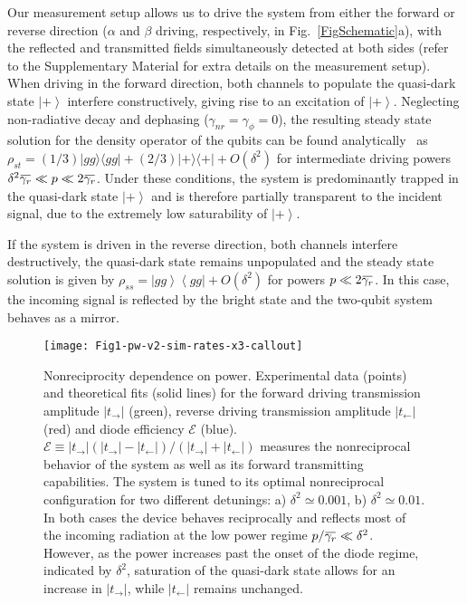 \documentclass[pra, twocolumn, amsmath, amssymb, notitlepage, longbibliography, showpacs, superscriptaddress]{revtex4-1}
\newcommand{\bra}[1]{\ensuremath{\left\langle #1\r|}}
\newcommand{\ket}[1]{\ensuremath{\left|#1\r\rangle}}
\renewcommand{\r}[0]{\right}
\newcommand{\overbar}[1]{\mkern 1.5mu\overline{\mkern-1.5mu#1\mkern-1.5mu}\mkern 1.5mu}
\begin{document}
Our measurement setup allows us to drive the system from 
either the forward or reverse direction 
($\alpha$ and $\beta$ driving, respectively, in Fig.~\ref{FigSchematic}a), 
with the reflected and transmitted fields 
simultaneously detected at both sides (refer to the Supplementary Material
for extra details on the measurement setup). When driving in the forward direction, 
both channels to populate the quasi-dark state $\ket{+}$ interfere 
constructively, giving rise to an excitation of $\ket{+}$. 
Neglecting non-radiative decay and dephasing ($\gamma_{nr}=\gamma_{\phi}=0$), the resulting steady state 
solution for the  density operator of the qubits can be found 
analytically~\cite{Muller2017a} as 
$\rho_{st}=(1/3)|gg\rangle\langle gg|+(2/3)|+\rangle \langle +| + O(\delta^2)$ 
for intermediate driving powers $\delta^2\overbar{\gamma_r} \ll p \ll 2\overbar{\gamma_r}$. 
Under these conditions, the system is predominantly trapped in the 
quasi-dark state $\ket{+}$ and is therefore partially transparent to the incident signal,
due to the extremely low saturability of  $\ket{+}$.

If the system is driven in the reverse direction, both channels 
interfere destructively, the quasi-dark state remains unpopulated
and the steady state solution is given by 
$\rho_{ss}=\ket{gg}\bra{gg} + O(\delta^2)$ for powers $p\ll 2\overbar{\gamma_r}$. 
In this case, the incoming signal is reflected by the bright state and the two-qubit 
system behaves as a mirror.

\begin{figure}[t] \centering
  \texttt{[image: Fig1-pw-v2-sim-rates-x3-callout]}
   \caption{Nonreciprocity dependence on power. Experimental data 
   (points) and theoretical fits (solid lines) for the forward 
   driving transmission amplitude $|t_\rightarrow|$ (green), 
   reverse driving transmission amplitude $|t_\leftarrow|$ (red) and diode efficiency $\mathcal{E}$ (blue). 
   $\mathcal{E} \equiv |t_\rightarrow|(|t_\rightarrow|-|t_\leftarrow|)/(|t_\rightarrow|+|t_\leftarrow|)$
   measures the nonreciprocal behavior of the system as well as 
   its forward transmitting capabilities.
   The system is tuned to its optimal nonreciprocal configuration for 
   two different detunings:  a) $\delta^2 \simeq 0.001$, b) 
   $\delta^2 \simeq 0.01$. In both cases
   the device behaves reciprocally and reflects most of the incoming radiation
   at the low power regime $p/\overbar{\gamma_r}\ll\delta^2$.
   However, as the power increases past the onset of the diode 
   regime, indicated by $\delta^2$, saturation of the quasi-dark state 
   allows for an increase in $|t_\rightarrow|$, while $|t_\leftarrow|$
   remains unchanged. 
   } 
	\label{FigPowerSweep}
\end{figure}
\end{document}
